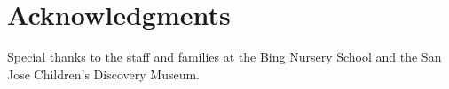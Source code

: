 \documentclass[10pt,letterpaper]{article}
\begin{document}

\section{Acknowledgments}

Special thanks to the staff and families at the Bing Nursery School and the San Jose Children's Discovery Museum.



\setlength{\bibleftmargin}{.125in} \setlength{\bibindent}{-\bibleftmargin}


\end{document}
